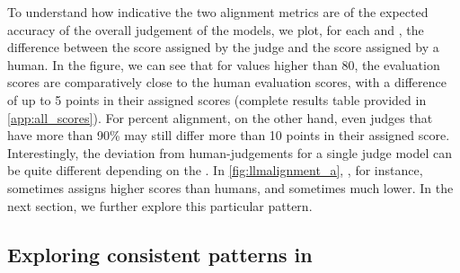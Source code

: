 To understand how indicative the two alignment metrics are of the expected accuracy of the overall judgement of the models, we plot, for each \judgemodel and \evaluatormodel, the difference between the score assigned by the judge and the score assigned by a human.
In the figure, we can see that for \scottspi values higher than 80, the evaluation scores are comparatively close to the human evaluation scores, with a difference of up to 5 points in their assigned scores (complete results table provided in \cref{app:all_scores}). %
For percent alignment, on the other hand, even judges that have more than 90\% may still differ more than 10 points in their assigned score.
% 
Interestingly, %
the deviation from human-judgements for a single judge model can be quite different depending on the \evaluatormodel.
In \cref{fig:llmalignment_a}, , for instance, sometimes assigns higher scores than humans, and sometimes much lower. 
In the next section, we further explore this particular pattern.

\subsection{Exploring consistent patterns in \judgemodels} \label{sec:results:exploringsystematicpatterns}

